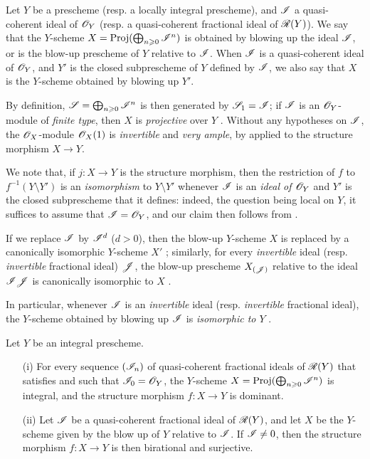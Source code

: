 \begin{definition}[8.1.3]
\label{2.8.1.3}
Let $Y$ be a prescheme (resp. a locally integral prescheme), and $\mathscr{I}$ a quasi-coherent ideal of $\mathscr{O}_Y$ (resp. a quasi-coherent fractional ideal of $\mathscr{R}(Y)$).
We say that the $Y$-scheme $X = \operatorname{Proj}(\bigoplus_{n\geqslant0}\mathscr{I}^n)$ is obtained by blowing up the ideal $\mathscr{I}$, or is the blow-up prescheme of $Y$ relative to $\mathscr{I}$.
When $\mathscr{I}$ is a quasi-coherent ideal of $\mathscr{O}_Y$, and $Y'$ is the closed subprescheme of $Y$ defined by $\mathscr{I}$, we also say that $X$ is the $Y$-scheme obtained by blowing up $Y'$.
\end{definition}

By definition, $\mathscr{S} = \bigoplus_{n\geqslant0}\mathscr{I}^n$ is then generated by $\mathscr{S}_1 = \mathscr{I}$;
if $\mathscr{I}$ is an $\mathscr{O}_Y$-module of \emph{finite type}, then $X$ is \emph{projective} over $Y$ .
Without any hypotheses on $\mathscr{I}$, the $\mathscr{O}_X$-module $\mathscr{O}_X(1)$ is \emph{invertible}  and \emph{very ample}, by  applied to the structure morphism $X\to Y$.

We note that, if $j:X\to Y$ is the structure morphism, then the restriction of $f$ to $f^{-1}(Y\setminus Y')$ is an \emph{isomorphism} to $Y\setminus Y'$ whenever $\mathscr{I}$ is an \emph{ideal of $\mathscr{O}_Y$} and $Y'$ is the closed subprescheme that it defines: indeed, the question being local on $Y$, it suffices to assume that $\mathscr{I} = \mathscr{O}_Y$, and our claim then follows from .

If we replace $\mathscr{I}$ by $\mathscr{I}^d$ ($d>0$), then the blow-up $Y$-scheme $X$ is replaced by a canonically isomorphic $Y$-scheme $X'$ ;
similarly, for every \emph{invertible} ideal (resp. \emph{invertible} fractional ideal) $\mathscr{J}$, the blow-up prescheme $X_{(\mathscr{J})}$ relative to the ideal $\mathscr{I}\mathscr{J}$ is canonically isomorphic to $X$ .

In particular, whenever $\mathscr{I}$ is an \emph{invertible} ideal (resp. \emph{invertible} fractional ideal), the $Y$-scheme obtained by blowing up $\mathscr{I}$ is \emph{isomorphic to $Y$} .

\begin{proposition}[8.1.3]
\label{2.8.1.4}
Let $Y$ be an integral prescheme.
\begin{enumerate}
    \item[\rm{(i)}] For every sequence $(\mathscr{I}_n)$ of quasi-coherent fractional ideals of $\mathscr{R}(Y)$ that satisfies 
        and such that $\mathscr{I}_0 = \mathscr{O}_Y$, the $Y$-scheme $X=\operatorname{Proj}(\bigoplus_{n\geqslant0}\mathscr{I}^n)$ is integral, and the structure morphism $f:X\to Y$ is dominant.
    \item[\rm{(ii)}] Let $\mathscr{I}$ be a quasi-coherent fractional ideal of $\mathscr{R}(Y)$, and let $X$ be the $Y$-scheme given by the blow up of $Y$ relative to $\mathscr{I}$.
        If $\mathscr{I} \neq 0$, then the structure morphism $f:X\to Y$ is then birational and surjective.
\end{enumerate}
\end{proposition}

